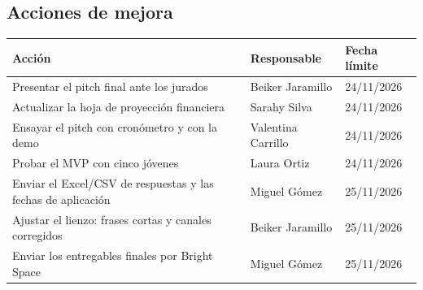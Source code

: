 \documentclass[11pt,a4paper]{article}
\begin{document}
\subsection{Acciones de mejora}
\begin{tabularx}{\textwidth}{X l l}
  \toprule
  \textbf{Acción} & \textbf{Responsable} & \textbf{Fecha límite} \\
  \midrule
  Presentar el pitch final ante los jurados & Beiker Jaramillo & 24/11/2026 \\
  Actualizar la hoja de proyección financiera & Sarahy Silva & 24/11/2026 \\
  Ensayar el pitch con cronómetro y con la demo & Valentina Carrillo & 24/11/2026 \\
  Probar el MVP con cinco jóvenes & Laura Ortiz & 24/11/2026 \\
  Enviar el Excel/CSV de respuestas y las fechas de aplicación & Miguel Gómez & 25/11/2026 \\
  Ajustar el lienzo: frases cortas y canales corregidos & Beiker Jaramillo & 25/11/2026 \\
  Enviar los entregables finales por Bright Space & Miguel Gómez & 25/11/2026 \\
  \bottomrule
\end{tabularx}
\end{document}
